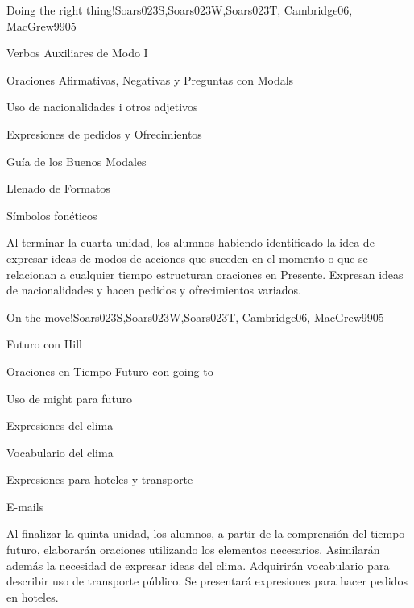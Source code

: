 \begin{syllabus}
\begin{unit}{Doing the right thing!}{Soars023S,Soars023W,Soars023T, Cambridge06, MacGrew99}{0}{5}
   \begin{topics}
      \item Verbos Auxiliares de Modo I
      \item Oraciones Afirmativas, Negativas y Preguntas con Modals
      \item Uso de nacionalidades i otros adjetivos
      \item Expresiones de pedidos y Ofrecimientos
      \item Guía de los Buenos Modales
      \item Llenado de Formatos
      \item Símbolos fonéticos
   \end{topics}

   \begin{unitgoals}
      \item Al terminar la cuarta unidad, los alumnos habiendo identificado la idea de expresar ideas de modos de acciones que suceden en el momento o que se relacionan a cualquier tiempo estructuran oraciones en Presente. Expresan ideas de nacionalidades y hacen pedidos y ofrecimientos variados.
   \end{unitgoals}

\end{unit}

\begin{unit}{On the move!}{Soars023S,Soars023W,Soars023T, Cambridge06, MacGrew99}{0}{5}
   \begin{topics}
      \item Futuro con Hill
      \item Oraciones en Tiempo Futuro con going to
      \item Uso de might para futuro
      \item Expresiones del clima
      \item Vocabulario del clima
      \item Expresiones para hoteles y transporte
      \item E-mails
   \end{topics}

   \begin{unitgoals}
      \item Al finalizar la quinta unidad, los alumnos, a partir de la comprensión del tiempo futuro, elaborarán oraciones utilizando los elementos necesarios. Asimilarán además la necesidad de expresar ideas del clima. Adquirirán vocabulario para describir uso de transporte público. Se presentará expresiones para hacer pedidos en hoteles.
   \end{unitgoals}


\end{unit}
\end{syllabus}
